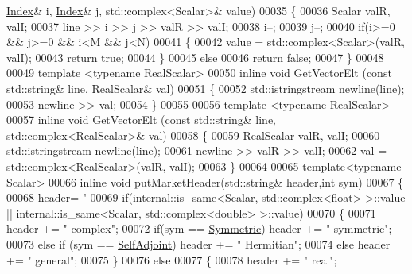 \begin{DoxyCode}
      \hyperlink{namespace_eigen_a62e77e0933482dafde8fe197d9a2cfde}{Index}& i, \hyperlink{namespace_eigen_a62e77e0933482dafde8fe197d9a2cfde}{Index}& j, std::complex<Scalar>& value)
00035   \{
00036     Scalar valR, valI;
00037     line >> i >> j >> valR >> valI;
00038     i--;
00039     j--;
00040     \textcolor{keywordflow}{if}(i>=0 && j>=0 && i<M && j<N)
00041     \{
00042       value = std::complex<Scalar>(valR, valI);
00043       \textcolor{keywordflow}{return} \textcolor{keyword}{true}; 
00044     \}
00045     \textcolor{keywordflow}{else}
00046       \textcolor{keywordflow}{return} \textcolor{keyword}{false};
00047   \}
00048 
00049   \textcolor{keyword}{template} <\textcolor{keyword}{typename} RealScalar>
00050   \textcolor{keyword}{inline} \textcolor{keywordtype}{void}  GetVectorElt (\textcolor{keyword}{const} std::string& line, RealScalar& val)
00051   \{
00052     std::istringstream newline(line);
00053     newline >> val;  
00054   \}
00055 
00056   \textcolor{keyword}{template} <\textcolor{keyword}{typename} RealScalar>
00057   \textcolor{keyword}{inline} \textcolor{keywordtype}{void} GetVectorElt (\textcolor{keyword}{const} std::string& line, std::complex<RealScalar>& val)
00058   \{
00059     RealScalar valR, valI; 
00060     std::istringstream newline(line);
00061     newline >> valR >> valI; 
00062     val = std::complex<RealScalar>(valR, valI);
00063   \}
00064   
00065   \textcolor{keyword}{template}<\textcolor{keyword}{typename} Scalar>
00066   \textcolor{keyword}{inline} \textcolor{keywordtype}{void} putMarketHeader(std::string& header,\textcolor{keywordtype}{int} sym)
00067   \{
00068     header= \textcolor{stringliteral}{"%
00069     \textcolor{keywordflow}{if}(internal::is\_same<Scalar, std::complex<float> >::value || internal::is\_same<Scalar, 
      std::complex<double> >::value)
00070     \{
00071       header += \textcolor{stringliteral}{" complex"}; 
00072       \textcolor{keywordflow}{if}(sym == \hyperlink{group__enums_gga39e3366ff5554d731e7dc8bb642f83cda7d30fb969ef6b763c098f0015108cef4}{Symmetric}) header += \textcolor{stringliteral}{" symmetric"};
00073       \textcolor{keywordflow}{else} \textcolor{keywordflow}{if} (sym == \hyperlink{group__enums_gga39e3366ff5554d731e7dc8bb642f83cda2491fc6765056421f504eb7e16083e8f}{SelfAdjoint}) header += \textcolor{stringliteral}{" Hermitian"};
00074       \textcolor{keywordflow}{else} header += \textcolor{stringliteral}{" general"};
00075     \}
00076     \textcolor{keywordflow}{else}
00077     \{
00078       header += \textcolor{stringliteral}{" real"}; 
}
\end{DoxyCode}
